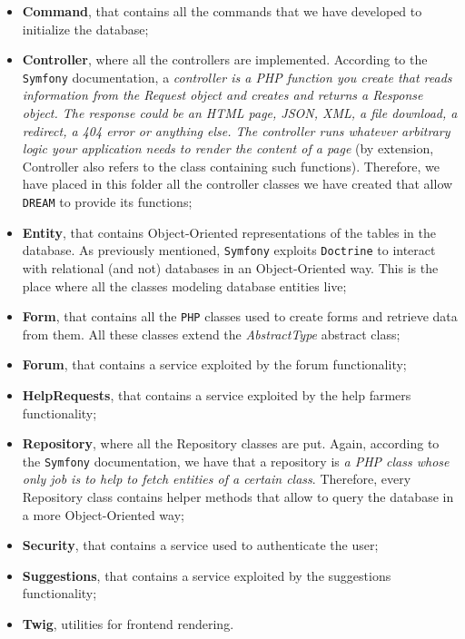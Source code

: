 \documentclass{article}
\begin{document}
\begin{itemize}
    \item \textbf{Command}, that contains all the commands that we have developed to initialize the database;
    \item \textbf{Controller}, where all the controllers are implemented. According to the \verb|Symfony| documentation, a \textit{controller is a PHP function you create that reads information from the Request object and creates and returns a Response object. The response could be an HTML page, JSON, XML, a file download, a redirect, a 404 error or anything else. The controller runs whatever arbitrary logic your application needs to render the content of a page} (by extension, Controller also refers to the class containing such functions). Therefore, we have placed in this folder all the controller classes we have created that allow \verb|DREAM| to provide its functions;
    \item \textbf{Entity}, that contains Object-Oriented representations of the tables in the database. As previously mentioned, \verb|Symfony| exploits \verb|Doctrine| to interact with relational (and not) databases in an Object-Oriented way. This is the place where all the classes modeling database entities live;
    \item \textbf{Form}, that contains all the \verb|PHP| classes used to create forms and retrieve data from them. All these classes extend the \textit{AbstractType} abstract class;
    \item \textbf{Forum}, that contains a service exploited by the forum functionality;
    \item \textbf{HelpRequests}, that contains a service exploited by the help farmers functionality;
    \item \textbf{Repository}, where all the Repository classes are put. Again, according to the \verb|Symfony| documentation, we have that a repository is \textit{a PHP class whose only job is to help to fetch entities of a certain class}. Therefore, every Repository class contains helper methods that allow to query the database in a more Object-Oriented way;
    \item \textbf{Security}, that contains a service used to authenticate the user;
     \item \textbf{Suggestions}, that contains a service exploited by the suggestions functionality;
    \item \textbf{Twig}, utilities for frontend rendering.
\end{itemize}
\newpage
\end{document}
